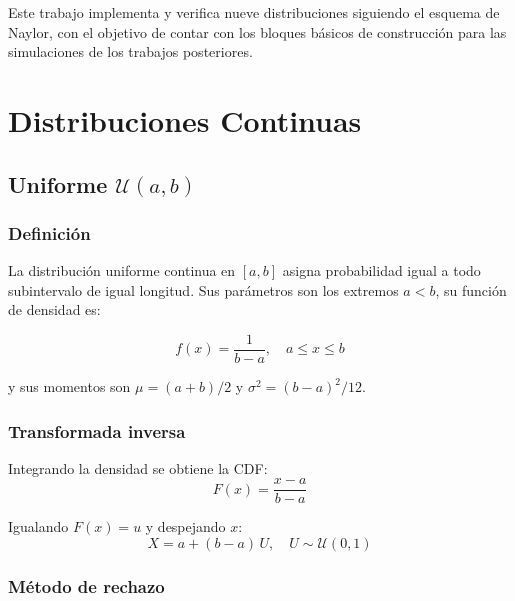 \documentclass[a4paper, 11pt]{article}
\begin{document}
Este trabajo implementa y verifica nueve distribuciones siguiendo el esquema de
Naylor, con el objetivo de contar con los bloques básicos de construcción para
las simulaciones de los trabajos posteriores.


\section{Distribuciones Continuas}

\subsection{Uniforme \texorpdfstring{$\mathcal{U}(a, b)$}{U(a,b)}}

\subsubsection*{Definición}

La distribución uniforme continua en $[a, b]$ asigna probabilidad igual a todo
subintervalo de igual longitud. Sus parámetros son los extremos $a < b$, su
función de densidad es:

\begin{equation}
  f(x) = \frac{1}{b - a}, \quad a \leq x \leq b
  \label{eq:unif_pdf}
\end{equation}

y sus momentos son $\mu = (a+b)/2$ y $\sigma^2 = (b-a)^2/12$.

\subsubsection*{Transformada inversa}

Integrando la densidad se obtiene la CDF:
\begin{equation}
  F(x) = \frac{x - a}{b - a}
\end{equation}

Igualando $F(x) = u$ y despejando $x$:
\begin{equation}
  \boxed{X = a + (b - a)\,U, \quad U \sim \mathcal{U}(0,1)}
  \label{eq:unif_inv}
\end{equation}

\subsubsection*{Método de rechazo}
\end{document}
